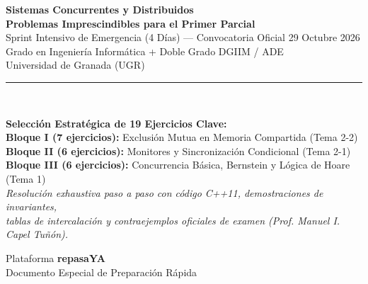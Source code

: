 \documentclass[11pt,a4paper,twoside,openright]{report}
\begin{document}
\begin{titlepage}
    \centering
    \vspace*{1.2cm}
    
    {\Huge\bfseries\color{scdDarkBlue}\textsf{Sistemas Concurrentes y Distribuidos}}\\[0.6cm]
    {\LARGE\bfseries\color{scdPrimary}\textsf{Problemas Imprescindibles para el Primer Parcial}}\\[0.4cm]
    {\large\textsf{Sprint Intensivo de Emergencia (4 Días) — Convocatoria Oficial 29 Octubre 2026}}\\[0.3cm]
    {\normalsize\textsf{Grado en Ingeniería Informática + Doble Grado DGIIM / ADE}}\\[0.2cm]
    {\normalsize\textsf{Universidad de Granada (UGR)}}\\[1.2cm]
    
    \rule{0.85\textwidth}{1.5pt}\\[1.5cm]
    
    \begin{tcolorbox}[
        colback=scdLightAccent,
        colframe=scdAccent,
        width=0.88\textwidth,
        arc=4pt,
        halign=center
    ]
        \large\textbf{\color{scdDarkBlue}Selección Estratégica de 19 Ejercicios Clave:}\\[6pt]
        \normalsize
        \textbf{Bloque I (7 ejercicios):} Exclusión Mutua en Memoria Compartida (Tema 2-2)\\[2pt]
        \textbf{Bloque II (6 ejercicios):} Monitores y Sincronización Condicional (Tema 2-1)\\[2pt]
        \textbf{Bloque III (6 ejercicios):} Concurrencia Básica, Bernstein y Lógica de Hoare (Tema 1)\\[6pt]
        \small\textit{Resolución exhaustiva paso a paso con código C++11, demostraciones de invariantes,\\
        tablas de intercalación y contraejemplos oficiales de examen (Prof. Manuel I. Capel Tuñón).}
    \end{tcolorbox}
    
    \vfill
    
    {\large\textsf{Plataforma \textbf{repasaYA}}}\\[0.2cm]
    {\small\textsf{Documento Especial de Preparación Rápida}}\\[0.6cm]
\end{titlepage}
\end{document}
